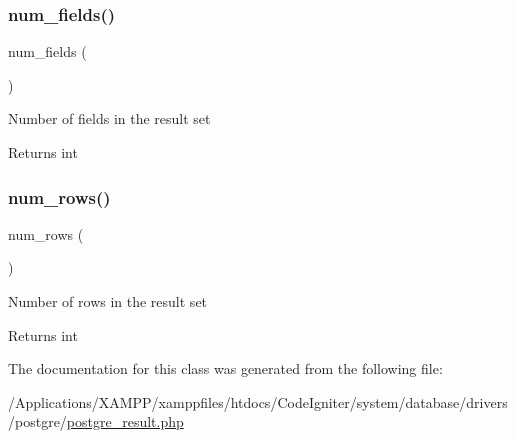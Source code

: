 \subsubsection{\texorpdfstring{num\+\_\+fields()}{num\_fields()}}
{\footnotesize\ttfamily num\+\_\+fields (\begin{DoxyParamCaption}{ }\end{DoxyParamCaption})}

Number of fields in the result set

\begin{DoxyReturn}{Returns}
int 
\end{DoxyReturn}
\mbox{\label{class_c_i___d_b__postgre__result_a218657c303ee499b97710ab0cd2f5d6e}} 
\subsubsection{\texorpdfstring{num\+\_\+rows()}{num\_rows()}}
{\footnotesize\ttfamily num\+\_\+rows (\begin{DoxyParamCaption}{ }\end{DoxyParamCaption})}

Number of rows in the result set

\begin{DoxyReturn}{Returns}
int 
\end{DoxyReturn}


The documentation for this class was generated from the following file\+:\begin{DoxyCompactItemize}
\item 
/\+Applications/\+X\+A\+M\+P\+P/xamppfiles/htdocs/\+Code\+Igniter/system/database/drivers/postgre/\mbox{\hyperlink{postgre__result_8php}{postgre\+\_\+result.\+php}}\end{DoxyCompactItemize}
